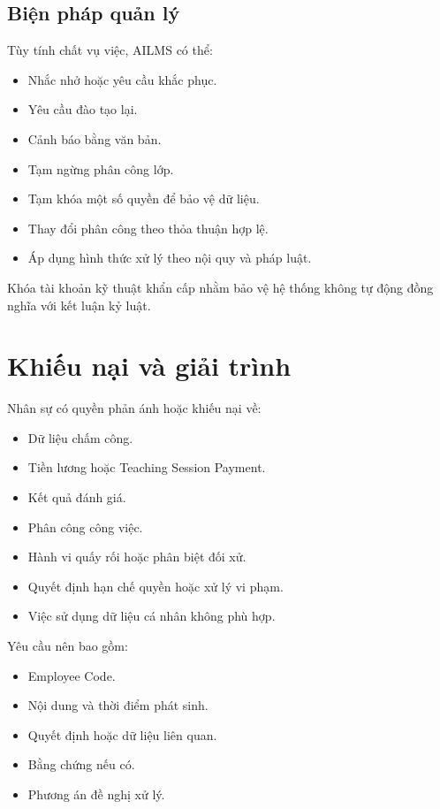 \documentclass[12pt,a4paper]{article}
\begin{document}
\subsection{Biện pháp quản lý}

Tùy tính chất vụ việc, AILMS có thể:

\begin{itemize}
    \item Nhắc nhở hoặc yêu cầu khắc phục.
    \item Yêu cầu đào tạo lại.
    \item Cảnh báo bằng văn bản.
    \item Tạm ngừng phân công lớp.
    \item Tạm khóa một số quyền để bảo vệ dữ liệu.
    \item Thay đổi phân công theo thỏa thuận hợp lệ.
    \item Áp dụng hình thức xử lý theo nội quy và pháp luật.
\end{itemize}

Khóa tài khoản kỹ thuật khẩn cấp nhằm bảo vệ hệ thống
không tự động đồng nghĩa với kết luận kỷ luật.

\section{Khiếu nại và giải trình}

Nhân sự có quyền phản ánh hoặc khiếu nại về:

\begin{itemize}
    \item Dữ liệu chấm công.
    \item Tiền lương hoặc Teaching Session Payment.
    \item Kết quả đánh giá.
    \item Phân công công việc.
    \item Hành vi quấy rối hoặc phân biệt đối xử.
    \item Quyết định hạn chế quyền hoặc xử lý vi phạm.
    \item Việc sử dụng dữ liệu cá nhân không phù hợp.
\end{itemize}

Yêu cầu nên bao gồm:

\begin{itemize}
    \item Employee Code.
    \item Nội dung và thời điểm phát sinh.
    \item Quyết định hoặc dữ liệu liên quan.
    \item Bằng chứng nếu có.
    \item Phương án đề nghị xử lý.
\end{itemize}
\end{document}
